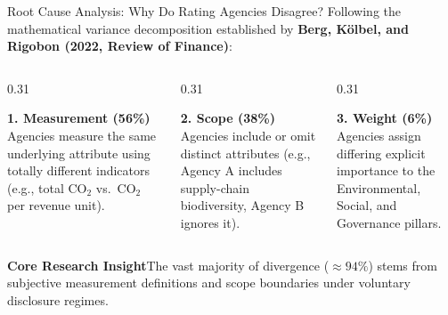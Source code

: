 \documentclass[aspectratio=169,10pt]{beamer}
\newcommand{\insight}[1]{\vspace{2pt}\begin{block}{\textbf{Core Research Insight}}#1\end{block}}
\begin{document}
\begin{frame}[t]{Root Cause Analysis: Why Do Rating Agencies Disagree?}
\small
Following the mathematical variance decomposition established by \textbf{Berg, Kölbel, and Rigobon (2022, Review of Finance)}:
\vspace{4pt}
\begin{columns}[T]
  \begin{column}{0.31\textwidth}
    \begin{block}{\textbf{1. Measurement (56\%)}}
      \small
      Agencies measure the same underlying attribute using totally different indicators (e.g., total CO$_2$ vs.\ CO$_2$ per revenue unit).
    \end{block}
  \end{column}
  
  \begin{column}{0.31\textwidth}
    \begin{block}{\textbf{2. Scope (38\%)}}
      \small
      Agencies include or omit distinct attributes (e.g., Agency A includes supply-chain biodiversity, Agency B ignores it).
    \end{block}
  \end{column}
  
  \begin{column}{0.31\textwidth}
    \begin{block}{\textbf{3. Weight (6\%)}}
      \small
      Agencies assign differing explicit importance to the Environmental, Social, and Governance pillars.
    \end{block}
  \end{column}
\end{columns}
\vspace{6pt}
\insight{The vast majority of divergence ($\approx 94\%$) stems from subjective measurement definitions and scope boundaries under voluntary disclosure regimes.}
\end{frame}
\end{document}
